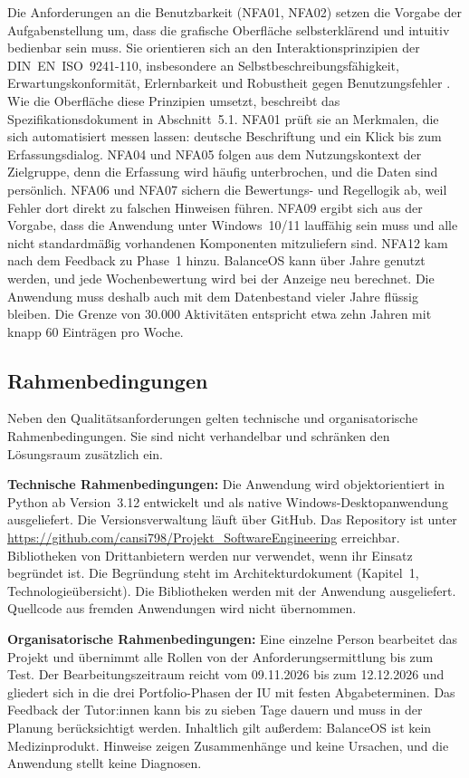 Die Anforderungen an die Benutzbarkeit (NFA01, NFA02) setzen die Vorgabe der Aufgabenstellung um, dass die grafische Oberfläche selbsterklärend und intuitiv bedienbar sein muss. Sie orientieren sich an den Interaktionsprinzipien der DIN~EN~ISO~9241-110, insbesondere an Selbstbeschreibungsfähigkeit, Erwartungskonformität, Erlernbarkeit und Robustheit gegen Benutzungsfehler \parencite[Abschn.~5]{iso9241}. Wie die Oberfläche diese Prinzipien umsetzt, beschreibt das Spezifikationsdokument in Abschnitt~5.1. NFA01 prüft sie an Merkmalen, die sich automatisiert messen lassen: deutsche Beschriftung und ein Klick bis zum Erfassungsdialog. NFA04 und NFA05 folgen aus dem Nutzungskontext der Zielgruppe, denn die Erfassung wird häufig unterbrochen, und die Daten sind persönlich. NFA06 und NFA07 sichern die Bewertungs- und Regellogik ab, weil Fehler dort direkt zu falschen Hinweisen führen. NFA09 ergibt sich aus der Vorgabe, dass die Anwendung unter Windows~10/11 lauffähig sein muss und alle nicht standardmäßig vorhandenen Komponenten mitzuliefern sind. NFA12 kam nach dem Feedback zu Phase~1 hinzu. BalanceOS kann über Jahre genutzt werden, und jede Wochenbewertung wird bei der Anzeige neu berechnet. Die Anwendung muss deshalb auch mit dem Datenbestand vieler Jahre flüssig bleiben. Die Grenze von 30.000 Aktivitäten entspricht etwa zehn Jahren mit knapp 60 Einträgen pro Woche.

\subsection{Rahmenbedingungen}
Neben den Qualitätsanforderungen gelten technische und organisatorische Rahmenbedingungen. Sie sind nicht verhandelbar und schränken den Lösungsraum zusätzlich ein.

\textbf{Technische Rahmenbedingungen:} Die Anwendung wird objektorientiert in Python ab Version~3.12 entwickelt und als native Windows-Desktopanwendung ausgeliefert. Die Versionsverwaltung läuft über GitHub. Das Repository ist unter \url{https://github.com/cansi798/Projekt_SoftwareEngineering} erreichbar. Bibliotheken von Drittanbietern werden nur verwendet, wenn ihr Einsatz begründet ist. Die Begründung steht im Architekturdokument (Kapitel~1, Technologieübersicht). Die Bibliotheken werden mit der Anwendung ausgeliefert. Quellcode aus fremden Anwendungen wird nicht übernommen.

\textbf{Organisatorische Rahmenbedingungen:} Eine einzelne Person bearbeitet das Projekt und übernimmt alle Rollen von der Anforderungsermittlung bis zum Test. Der Bearbeitungszeitraum reicht vom 09.11.2026 bis zum 12.12.2026 und gliedert sich in die drei Portfolio-Phasen der IU mit festen Abgabeterminen. Das Feedback der Tutor:innen kann bis zu sieben Tage dauern und muss in der Planung berücksichtigt werden. Inhaltlich gilt außerdem: BalanceOS ist kein Medizinprodukt. Hinweise zeigen Zusammenhänge und keine Ursachen, und die Anwendung stellt keine Diagnosen.
